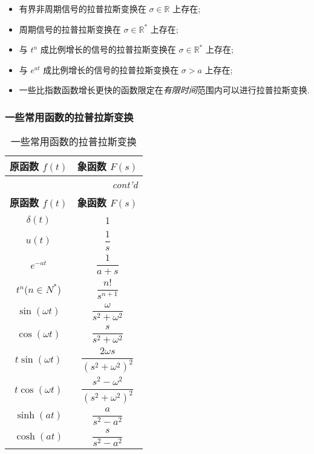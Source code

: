 \begin{itemize}
    \item 有界非周期信号的拉普拉斯变换在 $\sigma\in\mathbb{R}$ 上存在;
    \item 周期信号的拉普拉斯变换在 $\sigma\in\mathbb{R}^*$ 上存在;
    \item 与 $t^n$ 成比例增长的信号的拉普拉斯变换在 $\sigma\in\mathbb{R}^*$ 上存在;
    \item 与 $e^{at}$ 成比例增长的信号的拉普拉斯变换在 $\sigma>a$ 上存在;
    \item 一些比指数函数增长更快的函数限定在\textit{有限时间}范围内可以进行拉普拉斯变换.
\end{itemize}

\subsubsection{一些常用函数的拉普拉斯变换}
\renewcommand{\arraystretch}{1.5}
\begin{longtable}{@{\extracolsep{\fill}}cc@{}}
    \caption{一些常用函数的拉普拉斯变换} \label{tab:4.1 laplace}                       \\

    \hline \textbf{原函数 $f(t)$} & \textbf{象函数 $F(s)$}                      \\ \hline
    \endfirsthead

    \multicolumn{2}{r}{\em \footnotesize cont'd}                          \\
    \hline \textbf{原函数 $f(t)$} & \textbf{象函数 $F(s)$}                      \\ \hline
    \endhead

    \hline
    \endlastfoot

    $\delta(t)$                & 1                                        \\
    $u(t)$                     & $\dfrac{1}{s}$                           \\
    $e^{-at}$                  & $\dfrac{1}{a+s}$                         \\
    $t^n$\quad ($n\in N^*$)    & $\dfrac{n!}{s^{n+1}}$                    \\
    $\sin(\omega t)$           & $\dfrac{\omega}{s^2+\omega^2}$           \\
    $\cos(\omega t)$           & $\dfrac{s}{s^2+\omega^2}$                \\
    $t\sin(\omega t)$          & $\dfrac{2\omega s}{(s^2+\omega^2)^2}$    \\
    $t\cos(\omega t)$          & $\dfrac{s^2-\omega^2}{(s^2+\omega^2)^2}$ \\
    $\sinh(at)$                & $\dfrac{a}{s^2-a^2}$                     \\
    $\cosh(at)$                & $\dfrac{s}{s^2-a^2}$                     \\
\end{longtable}
\renewcommand{\arraystretch}{1}
